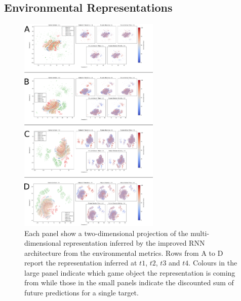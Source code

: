 \subsection{Environmental Representations}
\begin{figure}[!htb]
\includegraphics[width=0.6\textwidth]{images/appendix_D/rnn_full_env_umap.png}
\centering
\caption[\textbf{Lower dimensional representation of the latent representations generated by the improved RNN architecture from the environmental metrics}]{Each panel show a two-dimensional projection of the multi-dimensional representation inferred by the improved RNN architecture from the environmental metrics. Rows from A to D report the representation inferred at $t1$, $t2$, $t3$ and $t4$. Colours in the large panel indicate which game object the representation is coming from while those in the small panels indicate the discounted sum of future predictions for a single target.}
\end{figure}
\FloatBarrier

